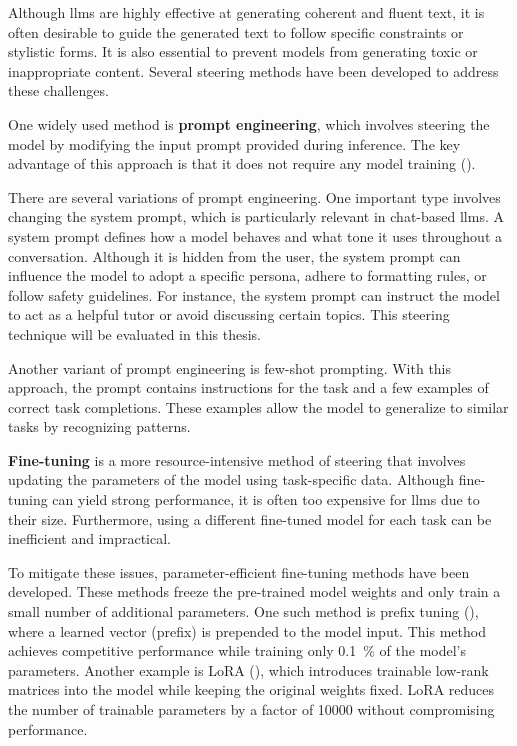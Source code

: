 Although \acp{llm} are highly effective at generating coherent and fluent text, it is often desirable to guide the generated text to follow specific constraints or stylistic forms. It is also essential to prevent models from generating toxic or inappropriate content. Several steering methods have been developed to address these challenges.

One widely used method is \textbf{prompt engineering}, which involves steering the model by modifying the input prompt provided during inference. The key advantage of this approach is that it does not require any model training (\cite{schulhoffPromptReportSystematic2024}).

There are several variations of prompt engineering. One important type involves changing the system prompt, which is particularly relevant in chat-based \acp{llm}. A system prompt defines how a model behaves and what tone it uses throughout a conversation. Although it is hidden from the user, the system prompt can influence the model to adopt a specific persona, adhere to formatting rules, or follow safety guidelines. For instance, the system prompt can instruct the model to act as a helpful tutor or avoid discussing certain topics. This steering technique will be evaluated in this thesis.

Another variant of prompt engineering is few-shot prompting. With this approach, the prompt contains instructions for the task and a few examples of correct task completions. These examples allow the model to generalize to similar tasks by recognizing patterns.


\textbf{Fine-tuning} is a more resource-intensive method of steering that involves updating the parameters of the model using task-specific data. Although fine-tuning can yield strong performance, it is often too expensive for \acp{llm} due to their size. Furthermore, using a different fine-tuned model for each task can be inefficient and impractical.

To mitigate these issues, parameter-efficient fine-tuning methods have been developed. These methods freeze the pre-trained model weights and only train a small number of additional parameters. One such method is prefix tuning (\cite{liPrefixtuningOptimizingContinuous2021}), where a learned vector (prefix) is prepended to the model input. This method achieves competitive performance while training only \SI{0.1}{\percent} of the model's parameters. Another example is LoRA (\cite{huLoRALowrankAdaptation2021}), which introduces trainable low-rank matrices into the model while keeping the original weights fixed. LoRA reduces the number of trainable parameters by a factor of \num{10000} without compromising performance.

